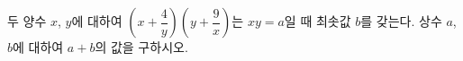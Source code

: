두 양수 $x$, $y$에 대하여 $\left(x+\dfrac{4}{y}\right)\left(y+\dfrac{9}{x}\right)$는 $xy=a$일 때 최솟값 $b$를 갖는다. 상수 $a$, $b$에 대하여 $a+b$의 값을 구하시오.

